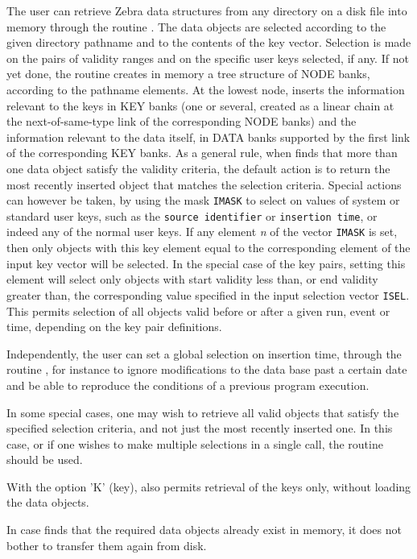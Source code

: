 The user can retrieve Zebra data structures from any directory on a
disk file into memory through the routine . The data objects are
selected according to the given directory pathname and to the contents
of the key vector. Selection is made on the pairs of validity ranges and
on the specific user keys selected, if any.
If not yet done, the routine creates
in memory a tree structure of NODE banks, according to the pathname
elements. At the lowest node,  inserts the information relevant to
the keys in KEY banks (one or several, created as a linear chain at the
next-of-same-type link of the corresponding NODE banks) and the
information relevant to the data itself, in DATA banks supported by the
first link of the corresponding KEY banks. As a general rule, when 
finds that more than one data object satisfy the validity criteria, the
default action is to return the most recently inserted object
that matches the selection criteria. Special actions can
however be taken, by using the mask {\tt IMASK} to select on values of
system or standard user keys, such as the {\tt source identifier} or
{\tt insertion time}, or indeed any of the normal user keys.
If any element {\it n} of the vector {\tt IMASK} is set, then only objects
with this key element equal to the corresponding element of the input
key vector will be selected. In the special case of the key pairs,
setting this element will select only objects with start validity
less than, or end validity greater than, the corresponding value specified
in the input selection vector {\tt ISEL}.
This permits selection of all objects valid before or after
a given run, event or time, depending on the key pair definitions.

Independently, the user can set a global selection on insertion time,
through the routine
, for instance to ignore modifications to the data base past a
certain date and be able to reproduce the conditions of a previous
program execution.

In some special cases, one may wish to retrieve all valid objects that
satisfy the specified selection criteria, and not just the most recently inserted one.
In this case, or if one wishes to
make multiple selections in a single call,
the routine  should be used.

With the option 'K' (key),  also permits retrieval of the keys
only, without loading the data objects.

In case  finds that the required data objects already exist in
memory, it does not bother to transfer them again from disk.

